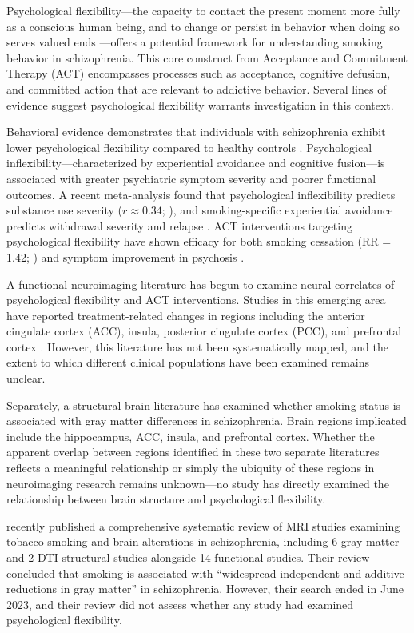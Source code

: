 \documentclass[12pt]{article}
\begin{document}
Psychological flexibility---the capacity to contact the present moment more fully as a conscious human being, and to change or persist in behavior when doing so serves valued ends \citep{hayes2006}---offers a potential framework for understanding smoking behavior in schizophrenia. This core construct from Acceptance and Commitment Therapy (ACT) encompasses processes such as acceptance, cognitive defusion, and committed action that are relevant to addictive behavior. Several lines of evidence suggest psychological flexibility warrants investigation in this context.

Behavioral evidence demonstrates that individuals with schizophrenia exhibit lower psychological flexibility compared to healthy controls \citep{levin2024}. Psychological inflexibility---characterized by experiential avoidance and cognitive fusion---is associated with greater psychiatric symptom severity and poorer functional outcomes. A recent meta-analysis found that psychological inflexibility predicts substance use severity ($r \approx 0.34$; \citealp{chong2025}), and smoking-specific experiential avoidance predicts withdrawal severity and relapse \citep{farris2014}. ACT interventions targeting psychological flexibility have shown efficacy for both smoking cessation (RR = 1.42; \citealp{fan2025}) and symptom improvement in psychosis \citep{jansen2021}.

A functional neuroimaging literature has begun to examine neural correlates of psychological flexibility and ACT interventions. Studies in this emerging area have reported treatment-related changes in regions including the anterior cingulate cortex (ACC), insula, posterior cingulate cortex (PCC), and prefrontal cortex \citep{smallwood2016, lee2023}. However, this literature has not been systematically mapped, and the extent to which different clinical populations have been examined remains unclear.

Separately, a structural brain literature has examined whether smoking status is associated with gray matter differences in schizophrenia. Brain regions implicated include the hippocampus, ACC, insula, and prefrontal cortex. Whether the apparent overlap between regions identified in these two separate literatures reflects a meaningful relationship or simply the ubiquity of these regions in neuroimaging research remains unknown---no study has directly examined the relationship between brain structure and psychological flexibility.

\citet{koster2025} recently published a comprehensive systematic review of MRI studies examining tobacco smoking and brain alterations in schizophrenia, including 6 gray matter and 2 DTI structural studies alongside 14 functional studies. Their review concluded that smoking is associated with ``widespread independent and additive reductions in gray matter'' in schizophrenia. However, their search ended in June 2023, and their review did not assess whether any study had examined psychological flexibility.
\end{document}
